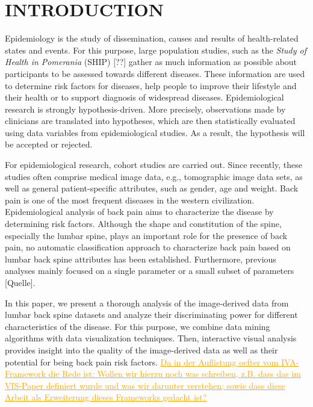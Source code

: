 \documentclass[a4paper,twoside]{style/article}
\newcommand{\com}[1]{\textcolor{orange}{\uline{#1}}}
\begin{document}
\section{\uppercase{Introduction}}
\label{sec:Introduction}
Epidemiology is the study of dissemination, causes and results of health-related states and events.
For this purpose, large population studies, such as the \emph{Study of Health in Pomerania} (SHIP) [??] gather as much information as possible about participants to be assessed towards different diseases.
These information are used to determine risk factors for diseases, help people to improve their lifestyle and their health or to support diagnosis of widespread diseases.
Epidemiological research is strongly hypothesis-driven.
More precisely, observations made by clinicians are translated into hypotheses, which are then statistically evaluated using data variables from epidemiological studies.
As a result, the hypothesis will be accepted or rejected.

For epidemiological research, cohort studies are carried out.
Since recently, these studies often comprise medical image data, e.g., tomographic image data sets, as well as general patient-specific attributes, such as gender, age and weight.
Back pain is one of the most frequent diseases in the western civilization. 
Epidemiological analysis of back pain aims to characterize the disease by determining risk factors.
Although the shape and constitution of the spine, especially the lumbar spine, plays an important role for the presence of back pain, no automatic classification approach to characterize back pain based on lumbar back spine attributes has been established.
Furthermore, previous analyses mainly focused on a single parameter or a small subset of parameters [Quelle].

In this paper, we present a thorough analysis of the image-derived data from lumbar back spine datasets and analyze their discriminating power for different characteristics of the disease.
For this purpose, we combine data mining algorithms with data visualization techniques.
Then, interactive visual analysis provides insight into the quality of the image-derived data as well as their potential for being back pain risk factors.
\com{Da in der Auflistung oefter vom IVA-Framework die Rede ist: Wollen wir hierzu noch was schreiben, z.B. dass das im VIS-Paper definiert wurde und was wir darunter verstehen; sowie dass diese Arbeit als Erweiterung dieses Frameworks gedacht ist?}
\end{document}
